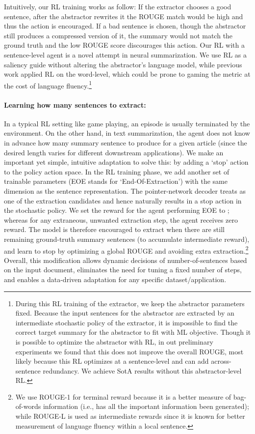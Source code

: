 \documentclass[11pt,a4paper]{article}
\begin{document}
Intuitively, our RL training works as follow:
If the extractor chooses a good sentence, after the abstractor rewrites it the ROUGE match would be high and thus the action is encouraged.
If a bad sentence is chosen, though the abstractor still produces a compressed version of it, the summary would not match the ground truth and the low ROUGE score discourages this action.
Our RL with a sentence-level agent is a novel attempt in neural summarization.
We use RL as a saliency guide without altering the abstractor's language model, while previous work applied RL on the word-level, which could be prone to gaming the metric at the cost of language fluency.\footnote{During this RL training of the extractor, we keep the abstractor parameters fixed. 
Because the input sentences for the abstractor are extracted by an intermediate stochastic policy of the extractor, it is impossible to find the correct target summary for the abstractor to fit  with ML objective. 
Though it is possible to optimize the abstractor with RL, 
in out preliminary experiments we found that this does not improve the overall ROUGE, most likely because this RL optimizes at a sentence-level and can add across-sentence redundancy. We achieve SotA results without this abstractor-level RL.}


\paragraph{Learning how many sentences to extract:}
\label{sec:end-of-extract}
In a typical RL setting like game playing, an episode is usually terminated by the environment.
On the other hand, in text summarization, the agent does not know in advance how many summary sentence to produce for a given article (since the desired length varies for different downstream applications).
We make an important yet simple, intuitive adaptation to solve this: by adding a `stop' action to the policy action space.
In the RL training phase, we add another set of trainable parameters  (EOE stands for `End-Of-Extraction') with the same dimension as the sentence representation.
The pointer-network decoder treats  as one of the extraction candidates and hence naturally results in a stop action in the stochastic policy.
We set the reward for the agent performing EOE to 
; whereas for any extraneous, unwanted extraction step, the agent receives zero reward.
The model is therefore encouraged to extract when there are still remaining ground-truth summary sentences (to accumulate intermediate reward),
and learn to stop by optimizing a global ROUGE and avoiding extra extraction.\footnote{We use ROUGE-1 for terminal reward because it is a better measure of bag-of-words information
(i.e., has all the important information been generated);
while ROUGE-L is used as intermediate rewards since it is known for better measurement of language fluency within a local sentence.}
Overall, this modification allows dynamic decisions of number-of-sentences based on the input document, eliminates the need for tuning a fixed number of steps, and enables a data-driven adaptation for any specific dataset/application.
\end{document}
